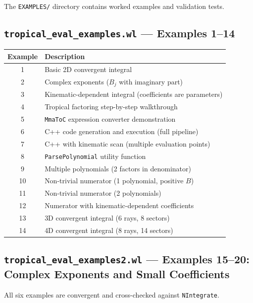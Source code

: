 \documentclass[11pt,a4paper]{article}
\begin{document}
The \texttt{EXAMPLES/} directory contains worked examples and validation tests.

\subsection*{\texttt{tropical\_eval\_examples.wl} --- Examples 1--14}

\begin{center}
\begin{tabular}{cl}
\toprule
\textbf{Example} & \textbf{Description} \\
\midrule
1 & Basic 2D convergent integral \\
2 & Complex exponents ($B_j$ with imaginary part) \\
3 & Kinematic-dependent integral (coefficients are parameters) \\
4 & Tropical factoring step-by-step walkthrough \\
5 & \texttt{MmaToC} expression converter demonstration \\
6 & C++ code generation and execution (full pipeline) \\
7 & C++ with kinematic scan (multiple evaluation points) \\
8 & \texttt{ParsePolynomial} utility function \\
9 & Multiple polynomials (2 factors in denominator) \\
10 & Non-trivial numerator (1 polynomial, positive $B$) \\
11 & Non-trivial numerator (2 polynomials) \\
12 & Numerator with kinematic-dependent coefficients \\
13 & 3D convergent integral (6 rays, 8 sectors) \\
14 & 4D convergent integral (8 rays, 14 sectors) \\
\bottomrule
\end{tabular}
\end{center}

\subsection*{\texttt{tropical\_eval\_examples2.wl} --- Examples 15--20: Complex Exponents and Small Coefficients}

All six examples are convergent and cross-checked against \texttt{NIntegrate}.
\end{document}
